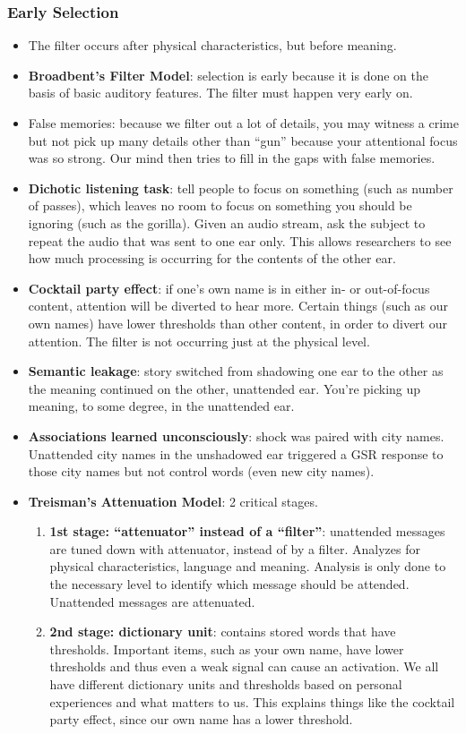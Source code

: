 \documentclass[]{article}
\begin{document}
			\subsubsection{Early Selection}
				\begin{itemize}
					\item The filter occurs after physical characteristics, but before meaning.
				\item \textbf{Broadbent's Filter Model}: selection is early because it is done on the basis of basic auditory features. The filter must happen very early on.
					\item False memories: because we filter out a lot of details, you may witness a crime but not pick up many details other than ``gun'' because your attentional focus was so strong. Our mind then tries to fill in the gaps with false memories.
					\item \textbf{Dichotic listening task}: tell people to focus on something (such as number of passes), which leaves no room to focus on something you should be ignoring (such as the gorilla). Given an audio stream, ask the subject to repeat the audio that was sent to one ear only. This allows researchers to see how much processing is occurring for the contents of the other ear.
					\item \textbf{Cocktail party effect}: if one's own name is in either in- or out-of-focus content, attention will be diverted to hear more. Certain things (such as our own names) have lower thresholds than other content, in order to divert our attention. The filter is not occurring just at the physical level.
					\item \textbf{Semantic leakage}: story switched from shadowing one ear to the other as the meaning continued on the other, unattended ear. You're picking up meaning, to some degree, in the unattended ear.
					\item \textbf{Associations learned unconsciously}: shock was paired with city names. Unattended city names in the unshadowed ear triggered a GSR response to those city names but not control words (even new city names).
					\item \textbf{Treisman's Attenuation Model}: 2 critical stages.
						\begin{enumerate}
							\item \textbf{1st stage: ``attenuator'' instead of a ``filter''}: unattended messages are tuned down with attenuator, instead of by a filter. Analyzes for physical characteristics, language and meaning. Analysis is only done to the necessary level to identify which message should be attended. Unattended messages are attenuated.
							\item \textbf{2nd stage: dictionary unit}: contains stored words that have thresholds. Important items, such as your own name, have lower thresholds and thus even a weak signal can cause an activation. We all have different dictionary units and thresholds based on personal experiences and what matters to us. This explains things like the cocktail party effect, since our own name has a lower threshold.
						\end{enumerate}
				\end{itemize}
\end{document}

